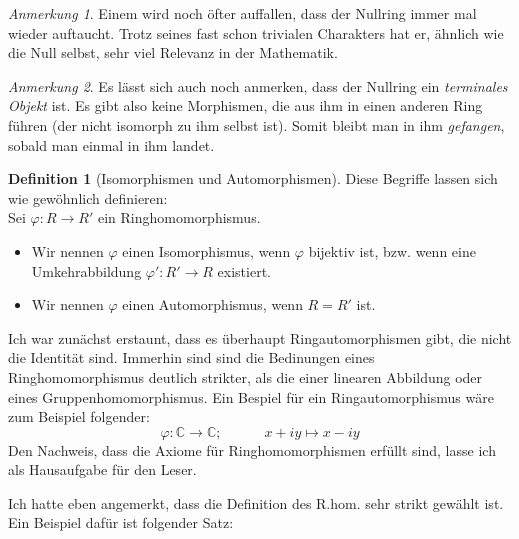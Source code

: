 \documentclass{article}
\theoremstyle{definition}
\newtheorem*{definition}{Definition}
\theoremstyle{remark}
\newtheorem*{anm}{Anmerkung}
\begin{document}
\begin{anm}
Einem wird noch öfter auffallen, dass der Nullring immer mal wieder auftaucht. Trotz seines fast schon
trivialen Charakters hat er, ähnlich wie die Null selbst, sehr viel Relevanz in der Mathematik.
\end{anm}
\begin{anm}
    Es lässt sich auch noch anmerken, dass der Nullring ein \emph{terminales Objekt} ist. Es gibt also keine
    Morphismen, die aus ihm in einen anderen Ring führen (der nicht isomorph zu ihm selbst ist). Somit bleibt
    man in ihm \emph{gefangen}, sobald man einmal in ihm landet.
\end{anm}

\begin{definition}[Isomorphismen und Automorphismen] Diese Begriffe lassen sich wie gewöhnlich definieren: \\
Sei $\varphi: R\to R'$ ein Ringhomomorphismus.
\begin{itemize}
    \item Wir nennen $\varphi$ einen Isomorphismus, wenn $\varphi$ bijektiv ist, bzw. wenn eine Umkehrabbildung     $\varphi': R'\to R$ existiert. 
    \item Wir nennen $\varphi$ einen Automorphismus, wenn $R=R'$ ist.
\end{itemize}

\end{definition}

Ich war zunächst erstaunt, dass es überhaupt Ringautomorphismen gibt, die nicht die Identität sind. Immerhin
sind sind die Bedinungen eines Ringhomomorphismus deutlich strikter, als die einer linearen Abbildung oder eines
Gruppenhomomorphismus.
Ein Bespiel für ein Ringautomorphismus wäre zum Beispiel folgender:
\[\varphi: \mathbb C\to\mathbb C; \hspace{3em} x+iy \longmapsto x-iy\]
Den Nachweis, dass die Axiome für Ringhomomorphismen erfüllt sind, lasse ich als Hausaufgabe für den Leser.

\vspace{0.7em}
Ich hatte eben angemerkt, dass die Definition des R.hom. sehr strikt gewählt ist. Ein Beispiel dafür ist
folgender Satz:
\end{document}

